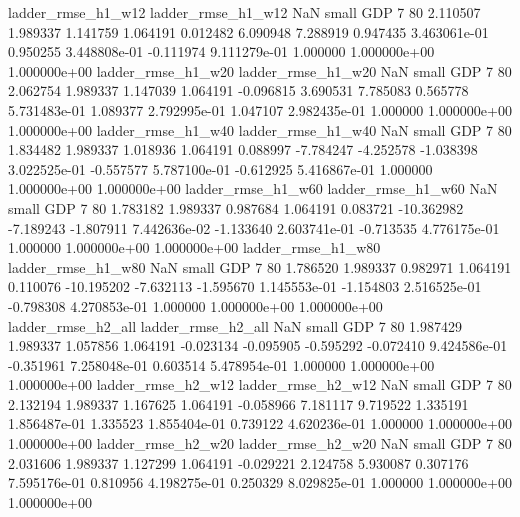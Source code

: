       ladder_rmse_h1_w12       ladder_rmse_h1_w12                   NaN      small      GDP                 7 80 2.110507       1.989337 1.141759       1.064191    0.012482      6.090948      7.288919     0.947435   3.463061e-01  0.950255 3.448808e-01    -0.111974   9.111279e-01            1.000000    1.000000e+00        1.000000e+00
      ladder_rmse_h1_w20       ladder_rmse_h1_w20                   NaN      small      GDP                 7 80 2.062754       1.989337 1.147039       1.064191   -0.096815      3.690531      7.785083     0.565778   5.731483e-01  1.089377 2.792995e-01     1.047107   2.982435e-01            1.000000    1.000000e+00        1.000000e+00
      ladder_rmse_h1_w40       ladder_rmse_h1_w40                   NaN      small      GDP                 7 80 1.834482       1.989337 1.018936       1.064191    0.088997     -7.784247     -4.252578    -1.038398   3.022525e-01 -0.557577 5.787100e-01    -0.612925   5.416867e-01            1.000000    1.000000e+00        1.000000e+00
      ladder_rmse_h1_w60       ladder_rmse_h1_w60                   NaN      small      GDP                 7 80 1.783182       1.989337 0.987684       1.064191    0.083721    -10.362982     -7.189243    -1.807911   7.442636e-02 -1.133640 2.603741e-01    -0.713535   4.776175e-01            1.000000    1.000000e+00        1.000000e+00
      ladder_rmse_h1_w80       ladder_rmse_h1_w80                   NaN      small      GDP                 7 80 1.786520       1.989337 0.982971       1.064191    0.110076    -10.195202     -7.632113    -1.595670   1.145553e-01 -1.154803 2.516525e-01    -0.798308   4.270853e-01            1.000000    1.000000e+00        1.000000e+00
      ladder_rmse_h2_all       ladder_rmse_h2_all                   NaN      small      GDP                 7 80 1.987429       1.989337 1.057856       1.064191   -0.023134     -0.095905     -0.595292    -0.072410   9.424586e-01 -0.351961 7.258048e-01     0.603514   5.478954e-01            1.000000    1.000000e+00        1.000000e+00
      ladder_rmse_h2_w12       ladder_rmse_h2_w12                   NaN      small      GDP                 7 80 2.132194       1.989337 1.167625       1.064191   -0.058966      7.181117      9.719522     1.335191   1.856487e-01  1.335523 1.855404e-01     0.739122   4.620236e-01            1.000000    1.000000e+00        1.000000e+00
      ladder_rmse_h2_w20       ladder_rmse_h2_w20                   NaN      small      GDP                 7 80 2.031606       1.989337 1.127299       1.064191   -0.029221      2.124758      5.930087     0.307176   7.595176e-01  0.810956 4.198275e-01     0.250329   8.029825e-01            1.000000    1.000000e+00        1.000000e+00
